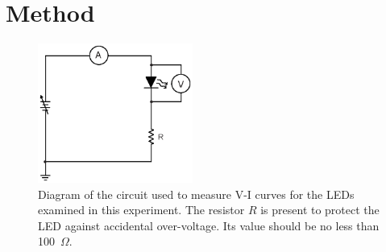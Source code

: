 \documentclass{revtex4}
\begin{document}

\section{Method}

\begin{figure}
\includegraphics[width=2in]{VIcircuit.eps}
\caption{\label{VIcircuit}
Diagram of the circuit used to measure V-I curves for the LEDs examined
in this experiment.  The resistor $R$ is present to protect the LED against
accidental over-voltage.  Its value should be no less than 100~$\Omega$.}
\end{figure}
\end{document}
